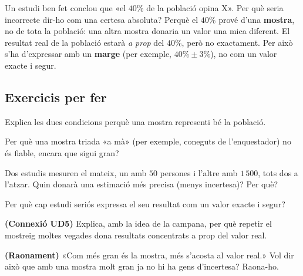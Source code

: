 \begin{exresolt}
Un estudi ben fet conclou que «el $40\%$ de la població opina X». Per què seria incorrecte
dir-ho com una certesa absoluta?
\solucio
Perquè el $40\%$ prové d'una \textbf{mostra}, no de tota la població: una altra mostra
donaria un valor una mica diferent. El resultat real de la població estarà \emph{a prop}
del $40\%$, però no exactament. Per això s'ha d'expressar amb un \textbf{marge}
(per exemple, $40\%\pm 3\%$), no com un valor exacte i segur.
\end{exresolt}

\subsection{Exercicis per fer}

\begin{exercicis}
\begin{exlist}
  \item Explica les dues condicions perquè una mostra representi bé la població.
  \item Per què una mostra triada «a mà» (per exemple, coneguts de l'enquestador) no és
        fiable, encara que sigui gran?
  \item Dos estudis mesuren el mateix, un amb $50$ persones i l'altre amb $1\,500$, tots
        dos a l'atzar. Quin donarà una estimació més precisa (menys incertesa)? Per què?
  \item Per què cap estudi seriós expressa el seu resultat com un valor exacte i segur?
  \item \textbf{(Connexió UD5)} Explica, amb la idea de la campana, per què repetir el
        mostreig moltes vegades dona resultats concentrats a prop del valor real.
  \item \textbf{(Raonament)} «Com més gran és la mostra, més s'acosta al valor real.» Vol
        dir això que amb una mostra molt gran ja no hi ha gens d'incertesa? Raona-ho.
\end{exlist}
\end{exercicis}


